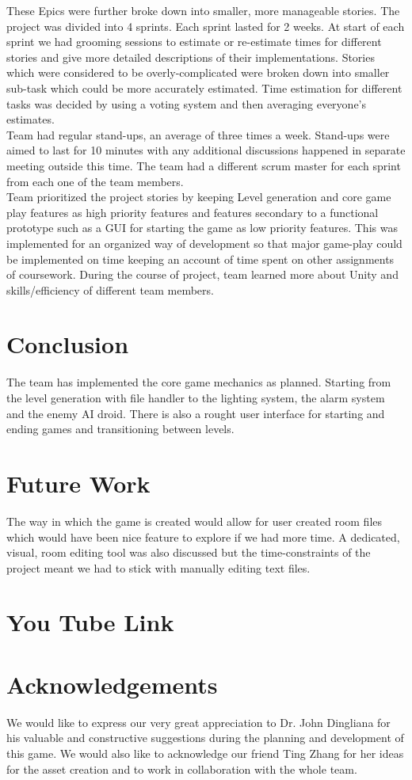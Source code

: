\documentclass[11pt]{article}
\begin{document}
These Epics were further broke down into smaller, more manageable stories. The project was divided into 4 sprints. Each sprint lasted for 2 weeks. At start of each sprint we had grooming sessions to estimate or re-estimate times for different stories and give more detailed descriptions of their implementations. Stories which were considered to be overly-complicated were broken down into smaller sub-task which could be more accurately estimated. Time estimation for different tasks was decided by using a voting system and then averaging everyone's estimates.\\

Team had regular stand-ups, an average of three times a week. Stand-ups were aimed to last for 10 minutes with any additional discussions happened in separate meeting outside this time. The team had a different scrum master for each sprint from each one of the team members.\\

Team prioritized the project stories by keeping Level generation and core game play features as high priority features and features secondary to a functional prototype such as a GUI for starting the game as low priority features. This was implemented for an organized way of development so that major game-play could be implemented on time keeping an account of time spent on other assignments of coursework. During the course of project, team learned more about Unity and skills/efficiency of different team members.

\section{Conclusion}
The team has implemented the core game mechanics as planned. Starting from the level generation with file handler to the lighting system, the alarm system and the enemy AI droid. There is also a rought user interface for starting and ending games and transitioning between levels.\\

\section{Future Work}

The way in which the game is created would allow for user created room files which would have been nice feature to explore if we had more time. A dedicated, visual, room editing tool was also discussed but the time-constraints of the project meant we had to stick with manually editing text files. 

\section{You Tube Link}

\section{Acknowledgements}
We would like to express our very great appreciation to Dr. John Dingliana for his valuable and constructive suggestions during the planning and development of this game. We would also like to acknowledge our friend Ting Zhang for her ideas for the asset creation and to work in collaboration with the whole team.  
\end{document}
